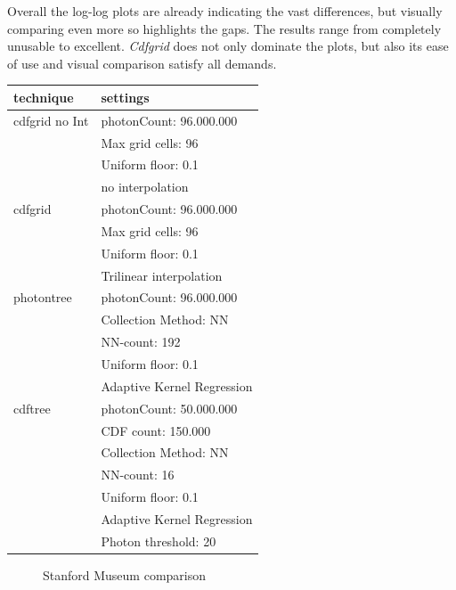 Overall the log-log plots are already indicating the vast differences, but visually comparing even more so highlights the gaps. The results range from completely unusable to excellent. \textit{Cdfgrid} does not only dominate the plots, but also its ease of use and visual comparison satisfy all demands.

\begin{center}

\begin{tabular*}{\textwidth}{@{}ll@{}}\toprule
technique & settings \\ \midrule

cdfgrid no Int & photonCount: 96.000.000 \\
& Max grid cells: 96 \\
& Uniform floor: 0.1 \\
& no interpolation \\
cdfgrid & photonCount: 96.000.000 \\
& Max grid cells: 96 \\
& Uniform floor: 0.1 \\
& Trilinear interpolation \\
photontree & photonCount: 96.000.000 \\
& Collection Method: NN \\
& NN-count: 192 \\
& Uniform floor: 0.1 \\
& Adaptive Kernel Regression \\
cdftree & photonCount: 50.000.000 \\
& CDF count: 150.000 \\
& Collection Method: NN \\
& NN-count: 16 \\ 
& Uniform floor: 0.1 \\
& Adaptive Kernel Regression \\
& Photon threshold: 20 \\

\bottomrule
\end{tabular*}
\label{tb:sm_settings}
\end{center}


\begin{figure}
    \centering
    \caption{Stanford Museum comparison}
    \label{fig:smmain_t1}
\end{figure}

